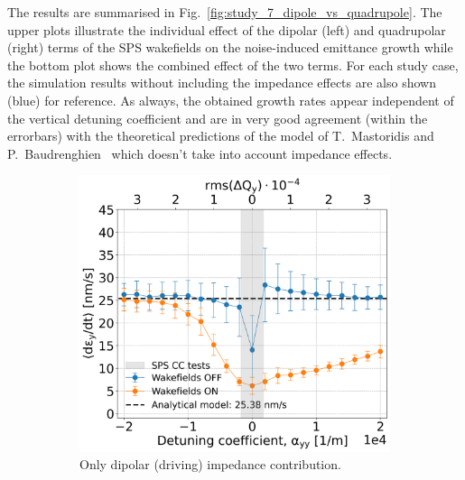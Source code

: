 The results are summarised in Fig.~\ref{fig:study_7_dipole_vs_quadrupole}. The upper plots illustrate the individual effect of the dipolar (left) and quadrupolar (right) terms of the SPS wakefields on the noise-induced emittance growth while the bottom plot shows the combined effect of the two terms. For each study case, the simulation results without including the impedance effects are also shown (blue) for reference. As always, the obtained growth rates appear independent of the vertical detuning coefficient and are in very good agreement (within the errorbars) with the theoretical predictions of the model of T.~Mastoridis and P.~Baudrenghien~\cite{PhysRevSTAB.18.101001} which doesn't take into account impedance effects.

\begin{figure}[htp]
    \centering
    \begin{subfigure}{.45\textwidth}
        \centering
        \includegraphics[width=.95\linewidth]{images/Ch7/dipolar_impedance.png}  
        \caption{Only dipolar (driving) impedance contribution.}
        \label{fig:study_7_dipole}
    \end{subfigure}
    \begin{subfigure}{.45\textwidth}
        \centering

\end{subfigure}
\end{figure}
